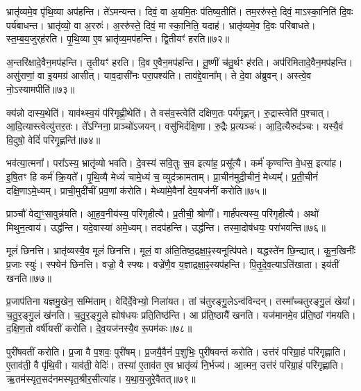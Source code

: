 भ्रातृ॑व्यमे॒व पृ॑थि॒व्या अप॑हन्ति।
ते॑ऽमन्यन्त।
दिवं॒ वा अ॒यमि॒तः प॑तिष्य॒तीति॑।
तम॒ररु॑स्ते॒ दिवं॒ माऽस्का॒निति॑ दि॒वः पर्य॑बाधन्त।
भ्रातृ॑व्यो॒ वा अ॒ररुः॑।
अ॒ररु॑स्ते॒ दिवं॒ मा स्का॒निति॒ यदाह॑।
भ्रातृ॑व्यमे॒व दि॒वः परि॑बाधते।
स्त॒म्ब॒य॒जुर्‌\mbox{}ह॑रति।
पृ॒थि॒व्या ए॒व भ्रातृ॑व्य॒मप॑हन्ति।
द्वि॒तीयꣳ॑ हरति॥७२॥

अ॒न्तरि॑क्षादे॒वैन॒मप॑हन्ति।
तृ॒तीयꣳ॑ हरति।
दि॒व ए॒वैन॒मप॑हन्ति।
तू॒ष्णीं च॑तु॒र्थꣳ ह॑रति।
अप॑रिमितादे॒वैन॒मप॑\-हन्ति।
असु॑राणां॒ वा इ॒यमग्र॑ आसीत्।
याव॒दासी॑नः परा॒पश्य॑ति।
ताव॑द्दे॒वाना᳚म्।
ते दे॒वा अ॑ब्रुवन्।
अस्त्वे॒व नो॒\-ऽस्यामपीति॑॥७३॥

क्य॑न्नो दास्य॒थेति॑।
याव॑थ्स्व॒यं प॑रिगृह्णी॒थेति॑।
ते वस॑व॒स्त्वेति॑ दक्षिण॒तः पर्य॑गृह्णन्।
रु॒द्रास्त्वेति॑ प॒श्चात्।
आ॒दि॒त्यास्त्वेत्यु॑त्तर॒तः।
ते᳚ऽग्निना॒ प्राञ्चो॑\-ऽजयन्।
वसु॑भिर्दक्षि॒णा।
रु॒द्रैः प्र॒त्यञ्चः॑।
आ॒दि॒त्यैरुद॑ञ्चः।
यस्यै॒वं वि॒दुषो॒ वेदिं॑ परिगृ॒ह्णन्ति॑॥७४॥

भव॑त्या॒त्मना᳚।
परा᳚ऽस्य॒ भ्रातृ॑व्यो भवति।
दे॒वस्य॑ सवि॒तुः स॒व इत्या॑ह॒ प्रसू᳚त्यै।
कर्म॑ कृण्वन्ति वे॒धस॒ इत्या॑ह।
इ॒षि॒तꣳ हि कर्म॑ क्रि॒यते᳚।
पृ॒थि॒व्यै मेध्यं॑ चामे॒ध्यं च॒ व्युद॑क्रामताम्।
प्रा॒चीन॑मुदी॒चीनं॒ मेध्यम्᳚।
प्र॒ती॒चीनं॑ दक्षि॒णा\-ऽमे॒ध्यम्।
प्राची॒मुदी॑चीं प्रव॒णां क॑रोति।
मेध्या॑मे॒वैनां᳚ देव॒यज॑नीं करोति॥७५॥

प्राञ्चौ॑ वेद्य॒ꣳ॒सावुन्न॑यति।
आ॒ह॒व॒नीय॑स्य॒ परि॑गृहीत्यै।
प्र॒तीची॒ श्रोणी᳚।
गार्ह॑पत्यस्य॒ परि॑गृहीत्यै।
अथो॑ मिथुन॒त्वाय॑।
उद्ध॑न्ति।
यदे॒वास्या॑ अमे॒ध्यम्।
तदप॑हन्ति।
उद्ध॑न्ति।
तस्मा॒दोष॑धयः॒ परा॑भवन्ति॥७६॥

मूलं॑ छिनत्ति।
भ्रातृ॑व्यस्यै॒व मूलं॑ छिनत्ति।
मूलं॒ वा अ॑ति॒तिष्ठ॒द्रक्षा॒ꣴ॒स्यनूत्पि॑पते।
यद्धस्ते॑न छि॒न्द्यात्।
कु॒न॒खिनीः᳚ प्र॒जाः स्युः॑।
स्फ्येन॑ छिनत्ति।
वज्रो॒ वै स्फ्यः।
वज्रे॑णै॒व य॒ज्ञाद्रक्षा॒ꣴ॒स्यप॑हन्ति।
पि॒तृ॒दे॒व॒त्या\-ऽति॑खाता।
इय॑तीं खनति॥७७॥

प्र॒जा\-प॑तिना यज्ञमु॒खेन॒ सम्मि॑ताम्।
वेदि॑र्दे॒वेभ्यो॒ निला॑यत।
तां च॑तुरङ्गु॒ले\-ऽन्व॑विन्दन्।
तस्मा᳚च्चतुरङ्गु॒लं खेया᳚।
च॒तु॒र॒ङ्गु॒लं ख॑नति।
च॒तु॒र॒ङ्गु॒ले ह्योष॑धयः प्रति॒तिष्ठ॑न्ति।
आ प्र॑ति॒ष्ठायै॑ खनति।
यज॑मानमे॒व प्र॑ति॒ष्ठां ग॑मयति।
द॒क्षि॒ण॒तो वर्\mbox{}षी॑यसीं करोति।
दे॒व॒यज॑नस्यै॒व रू॒पम॑कः॥७८॥

पुरी॑षवतीं करोति।
प्र॒जा वै प॒शवः॒ पुरी॑षम्।
प्र॒जयै॒वैनं॑ प॒शुभिः॒ पुरी॑षवन्तं करोति।
उत्त॑रं परिग्रा॒हं परि॑गृह्णाति।
ए॒ताव॑ती॒ वै पृ॑थि॒वी।
याव॑ती॒ वेदिः॑।
तस्या॑ ए॒ताव॑त ए॒व भ्रातृ॑व्यं नि॒र्भज्य॑।
आ॒त्मन॒ उत्त॑रं परिग्रा॒हं परि॑गृह्णाति।
ऋ॒तम॑स्यृत॒सद॑नमस्यृत॒श्रीर॒सीत्या॑ह।
य॒था॒\-य॒जु\-रे॒वै\-तत्॥७९॥

